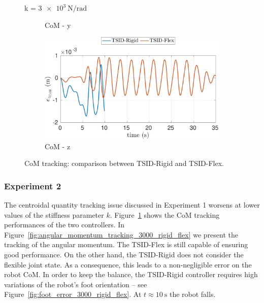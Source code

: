 \begin{figure}[t]
\begin{myframe}{k = $\SI{3e3}{\newton \per \radian}$}
\begin{subfigure}[b]{0.49\textwidth}
        \caption{CoM - y}
    \end{subfigure}
     \begin{subfigure}[b]{0.49\textwidth}
        \centering
        \includegraphics[width=\columnwidth]{chapter_flexible_joints/figures/comparison_3000_com_error_z.pdf}
        \caption{CoM - z}
    \end{subfigure}
    \end{myframe}
    \caption{CoM tracking: comparison between TSID-Rigid and TSID-Flex.\label{fig:com_tracking_3000_com_rigid_flex}}
\end{figure}


\subsubsection{Experiment 2}
The centroidal quantity tracking issue discussed in Experiment 1 worsens at lower values of the stiffness parameter $k$.
Figure~\ref{fig:com_tracking_3000_com_rigid_flex} shows the CoM tracking performances of the two controllers. In Figure~\ref{fig:angular_momentum_tracking_3000_rigid_flex} we present the tracking of the angular momentum. The TSID-Flex is still capable of ensuring good performance. On the other hand, the TSID-Rigid does not consider the flexible joint state. As a consequence, this leads to a non-negligible error on the robot CoM. In order to keep the balance, the TSID-Rigid controller requires high variations of the robot's foot orientation -- see Figure~\ref{fig:foot_error_3000_rigid_flex}. At $t\approx\SI{10}{\second}$ the robot falls.

